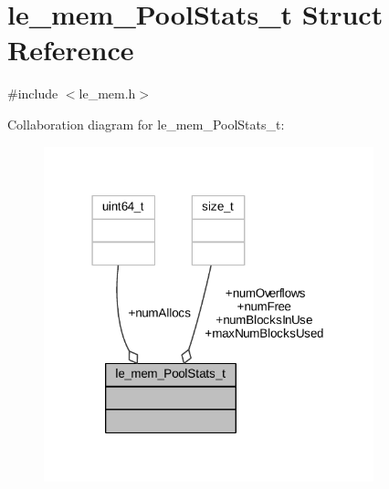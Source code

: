\hypertarget{structle__mem___pool_stats__t}{}\section{le\+\_\+mem\+\_\+\+Pool\+Stats\+\_\+t Struct Reference}
\label{structle__mem___pool_stats__t}


{\ttfamily \#include $<$le\+\_\+mem.\+h$>$}



Collaboration diagram for le\+\_\+mem\+\_\+\+Pool\+Stats\+\_\+t\+:
\nopagebreak
\begin{figure}[H]
\begin{center}
\leavevmode
\includegraphics[width=271pt]{structle__mem___pool_stats__t__coll__graph}
\end{center}
\end{figure}
